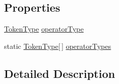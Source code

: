 \subsection*{Properties}
\begin{DoxyCompactItemize}
\item 
\hyperlink{a00026_a301aa7c866593a5b625a8fc158bbeace}{Token\-Type} \hyperlink{a00058_ac2de2f59be0e69b316627a4de16fadd3}{operator\-Type}
\item 
static \hyperlink{a00026_a301aa7c866593a5b625a8fc158bbeace}{Token\-Type}\mbox{[}$\,$\mbox{]} \hyperlink{a00058_a8dca7db3b76b8c358aba6068274e07df}{operator\-Types}
\end{DoxyCompactItemize}


\subsection{Detailed Description}


